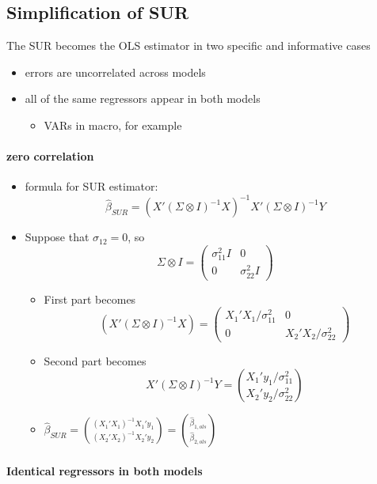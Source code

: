 \subsection{Simplification of SUR}
\label{sec-2-5}

     The SUR becomes the OLS estimator in two specific and informative
     cases
\begin{itemize}
\item errors are uncorrelated across models
\item all of the same regressors appear in both models
\begin{itemize}
\item VARs in macro, for example
\end{itemize}
\end{itemize}
\paragraph{zero correlation}
\label{sec-2-5-1}

\begin{itemize}
\item formula for SUR estimator:
       \[\hat\beta_{SUR} = (X'(\Sigma \otimes I)^{-1}X)^{-1}X'(\Sigma
       \otimes I)^{-1}Y\]
\item Suppose that $\sigma_{12} = 0$, so
        \[ \Sigma \otimes I = (\begin{matrix} \sigma_{11}^2 I & 0 \\ 0
        & \sigma_{22}^2 I \end{matrix})\]
\begin{itemize}
\item First part becomes \[(X'( \Sigma \otimes I)^{-1} X)
          = (\begin{matrix} X_1'X_1 / \sigma_{11}^2 & 0 \\ 0 & X_2'X_2
          / \sigma_{22}^2 \end{matrix}) \]
\item Second part becomes 
          \[X'(\Sigma \otimes I)^{-1}Y = \binom{X_1' y_1 /
          \sigma_{11}^2}{X_2'y_2 / \sigma_{22}^2}\]
\item $\hat\beta_{SUR} =
          \binom{(X_1'X_1)^{-1}X_1'y_1}{(X_2'X_2)^{-1}X_2'y_2} =
          \binom{\hat\beta_{1,ols}}{\hat\beta_{2,ols}}$
\end{itemize}
\end{itemize}
\paragraph{Identical regressors in both models}
\label{sec-2-5-2}

